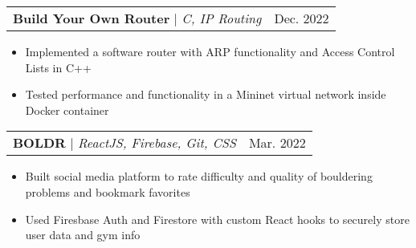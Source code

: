 \documentclass[letterpaper,11pt]{article}
\makeatletter
\newcommand{\resumeItem}[1]{
  \item\small{
    {#1 \vspace{-2pt}}
  }
}
\newcommand{\resumeProjectHeading}[2]{
  \item
  \begin{tabular*}{0.97\textwidth}{l@{\extracolsep{\fill}}r}
    \small#1 & #2 \\
  \end{tabular*}\vspace{-7pt}
}
\newcommand{\resumeItemListStart}{\begin{itemize}}
\newcommand{\resumeItemListEnd}{\end{itemize}\vspace{-5pt}}
\makeatother
\begin{document}
    \resumeProjectHeading
      {\textbf{Build Your Own Router} $|$ \emph{C, IP Routing}}{Dec. 2022}
      \resumeItemListStart
        \resumeItem{
          Implemented a software router with ARP functionality and Access
          Control Lists in C++
        }
        \resumeItem{
          Tested performance and functionality in a Mininet virtual network inside
          Docker container
        }
      \resumeItemListEnd

    \resumeProjectHeading
    {\textbf{BOLDR} $|$ \emph{ReactJS, Firebase, Git, CSS}}{Mar. 2022}
    \resumeItemListStart
      \resumeItem{
        Built social media platform to rate difficulty and quality of 
        bouldering problems and bookmark favorites 
      }
      \resumeItem{
        Used Firesbase Auth and Firestore with custom React hooks 
        to securely store user data and gym info
      }
    \resumeItemListEnd




\end{document}
